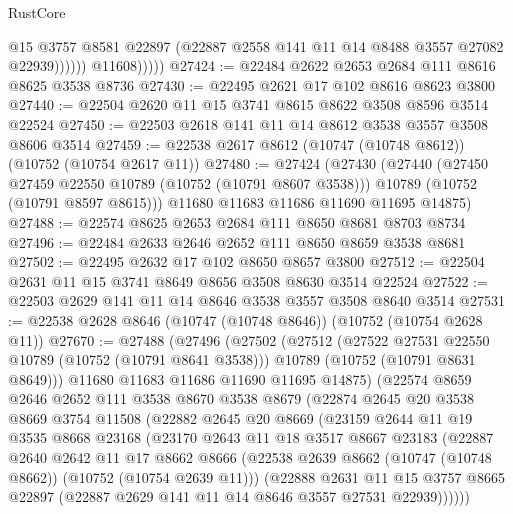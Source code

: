 \begin{lexlean}{RustCore}
\begin{coremodule}
                        @15
                        @3757
                        @8581
                        @22897
                        (@22887 @2558 @141 @11 @14 @8488 @3557 @27082 @22939))))))
              @11608)))))
@27424 := @22484 @2622 @2653 @2684 @111 @8616 @8625 @3538 @8736
@27430 := @22495 @2621 @17 @102 @8616 @8623 @3800
@27440 := @22504 @2620 @11 @15 @3741 @8615 @8622 @3508 @8596 @3514 @22524
@27450 := @22503 @2618 @141 @11 @14 @8612 @3538 @3557 @3508 @8606 @3514
@27459 := @22538 @2617 @8612 (@10747 (@10748 @8612)) (@10752 (@10754 @2617 @11))
@27480 := @27424
    (@27430
      (@27440
        (@27450 @27459 @22550 @10789 (@10752 (@10791 @8607 @3538)))
        @10789
        (@10752 (@10791 @8597 @8615)))
      @11680
      @11683
      @11686
      @11690
      @11695
      @14875)
@27488 := @22574 @8625 @2653 @2684 @111 @8650 @8681 @8703 @8734
@27496 := @22484 @2633 @2646 @2652 @111 @8650 @8659 @3538 @8681
@27502 := @22495 @2632 @17 @102 @8650 @8657 @3800
@27512 := @22504 @2631 @11 @15 @3741 @8649 @8656 @3508 @8630 @3514 @22524
@27522 := @22503 @2629 @141 @11 @14 @8646 @3538 @3557 @3508 @8640 @3514
@27531 := @22538 @2628 @8646 (@10747 (@10748 @8646)) (@10752 (@10754 @2628 @11))
@27670 := @27488
    (@27496
      (@27502
        (@27512
          (@27522 @27531 @22550 @10789 (@10752 (@10791 @8641 @3538)))
          @10789
          (@10752 (@10791 @8631 @8649)))
        @11680
        @11683
        @11686
        @11690
        @11695
        @14875)
      (@22574
        @8659
        @2646
        @2652
        @111
        @3538
        @8670
        @3538
        @8679
        (@22874
          @2645
          @20
          @3538
          @8669
          @3754
          @11508
          (@22882
            @2645
            @20
            @8669
            (@23159
              @2644
              @11
              @19
              @3535
              @8668
              @23168
              (@23170
                @2643
                @11
                @18
                @3517
                @8667
                @23183
                (@22887
                  @2640
                  @2642
                  @11
                  @17
                  @8662
                  @8666
                  (@22538 @2639 @8662 (@10747 (@10748 @8662)) (@10752 (@10754 @2639 @11)))
                  (@22888
                    @2631
                    @11
                    @15
                    @3757
                    @8665
                    @22897
                    (@22887 @2629 @141 @11 @14 @8646 @3557 @27531 @22939))))))

\end{coremodule}
\end{lexlean}
